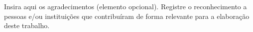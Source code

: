 \begin{agradecimentos}
Insira aqui os agradecimentos (elemento opcional). Registre o reconhecimento a pessoas e/ou instituições que contribuíram de forma relevante para a elaboração deste trabalho.
\end{agradecimentos}
